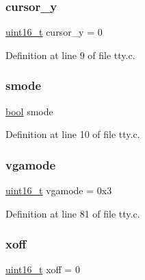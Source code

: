 \subsubsection{\texorpdfstring{cursor\+\_\+y}{cursor\_y}}
{\footnotesize\ttfamily \hyperlink{a00134_a273cf69d639a59973b6019625df33e30_a273cf69d639a59973b6019625df33e30}{uint16\+\_\+t} cursor\+\_\+y = 0}



Definition at line 9 of file tty.\+c.

\mbox{\label{a00173_a22b8d30f7aee33f172c1239aed53e7db_a22b8d30f7aee33f172c1239aed53e7db}} 
\subsubsection{\texorpdfstring{smode}{smode}}
{\footnotesize\ttfamily \hyperlink{a00134_af6a258d8f3ee5206d682d799316314b1_af6a258d8f3ee5206d682d799316314b1}{bool} smode}



Definition at line 10 of file tty.\+c.

\mbox{\label{a00173_af93b0649fdd1bea5b6d29ed37205aa2c_af93b0649fdd1bea5b6d29ed37205aa2c}} 
\subsubsection{\texorpdfstring{vgamode}{vgamode}}
{\footnotesize\ttfamily \hyperlink{a00134_a273cf69d639a59973b6019625df33e30_a273cf69d639a59973b6019625df33e30}{uint16\+\_\+t} vgamode = 0x3}



Definition at line 81 of file tty.\+c.

\mbox{\label{a00173_abaa0d20f0e52ce0d3a7d706f6ac16266_abaa0d20f0e52ce0d3a7d706f6ac16266}} 
\subsubsection{\texorpdfstring{xoff}{xoff}}
{\footnotesize\ttfamily \hyperlink{a00134_a273cf69d639a59973b6019625df33e30_a273cf69d639a59973b6019625df33e30}{uint16\+\_\+t} xoff = 0}



